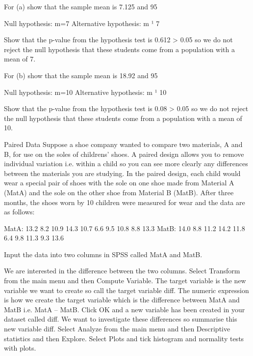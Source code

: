 For (a) show that the sample mean is 7.125 and 95%
 
Null hypothesis: m=7
Alternative hypothesis: m ¹ 7
 
Show that the p-value from the hypothesis test is 0.612 > 0.05 so we do not reject the null hypothesis that these students come from a population with a mean of 7.
 
For (b) show that the sample mean is 18.92 and 95%
 
Null hypothesis: m=10
Alternative hypothesis: m ¹ 10
 
Show that the p-value from the hypothesis test is 0.08 > 0.05 so we do not reject the null hypothesis that these students come from a population with a mean of 10.
 
  
Paired Data
Suppose a shoe company wanted to compare two materials, A and B, for use on the soles of childrens’ shoes. A paired design allows you to remove individual variation i.e. within a child so you can see more clearly any differences between the materials you are studying. In the paired design, each child would wear a special pair of shoes with the sole on one shoe made from Material A (MatA) and the sole on the other shoe from Material B (MatB). After three months, the shoes worn by 10 children were measured for wear and the data are as follows:
 
 
MatA:  13.2  8.2  10.9  14.3  10.7  6.6  9.5  10.8  8.8  13.3
MatB:  14.0  8.8  11.2  14.2  11.8  6.4  9.8  11.3  9.3  13.6
 
Input the data into two columns in SPSS called MatA and MatB.
 
We are interested in the difference between the two columns. Select Transform from the main menu and then Compute Variable. The target variable is the new variable we want to create so call the target variable diff. The numeric expression is how we create the target variable which is the difference between MatA and MatB i.e. MatA – MatB. Click OK and a new variable has been created in your dataset called diff. We want to investigate these differences so summarise this new variable diff. Select Analyze from the main menu and then Descriptive statistics and then Explore. Select Plots and tick histogram and normality tests with plots.
 
